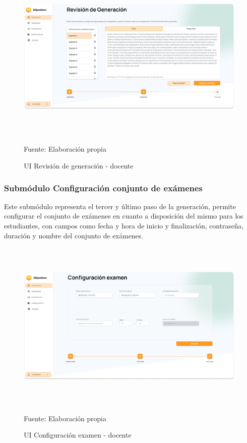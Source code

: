 \documentclass[../Main.tex]{subfiles}
\begin{document}
    \begin{figure}[H]
	\begin{Center}
		\includegraphics[width=6.4in,height=3.3in]{Images/ui_docente_revision_generacion.png}
	    \caption{UI Revisión de generación - docente}
	    Fuente: Elaboración propia
        \label{fig:section}
	\end{Center}
    \end{figure}
    
    \subsubsection{Submódulo Configuración conjunto de exámenes}
    \begin{justify}
    Este submódulo representa el tercer y último paso de la generación, permite configurar el conjunto de exámenes en cuanto a disposición del mismo para los estudiantes, con campos como fecha y hora de inicio y finalización, contraseña, duración y nombre del conjunto de exámenes.
    
    \begin{figure}[H]
	\begin{Center}
		\includegraphics[width=6.4in,height=3.3in]{Images/ui_docente_conf_examen.png}
	    \caption{UI Configuración examen - docente}
	    Fuente: Elaboración propia
        \label{fig:section}
	\end{Center}
    \end{figure}
    \end{justify}
    
\end{document}
